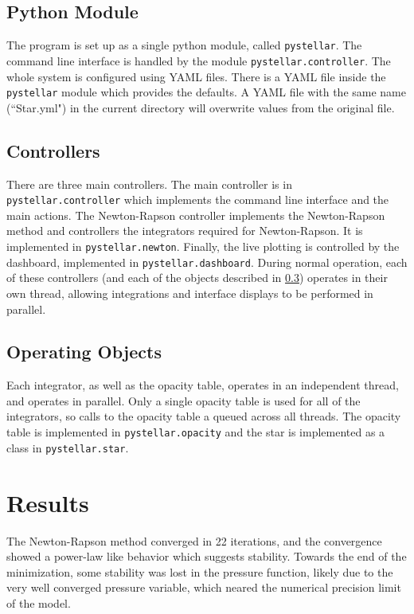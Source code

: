 \documentclass[12pt]{article}
\begin{document}
\subsection{Python Module}
The program is set up as a single python module, called \lstinline{pystellar}. The command line interface is handled by the module \lstinline{pystellar.controller}. The whole system is configured using YAML files. There is a YAML file inside the \lstinline{pystellar} module which provides the defaults. A YAML file with the same name (``Star.yml") in the current directory will overwrite values from the original file.

\subsection{Controllers}
There are three main controllers. The main controller is in \lstinline{pystellar.controller} which implements the command line interface and the main actions. The Newton-Rapson controller implements the Newton-Rapson method and controllers the integrators required for Newton-Rapson. It is implemented in \lstinline{pystellar.newton}. Finally, the live plotting is controlled by the dashboard, implemented in \lstinline{pystellar.dashboard}. During normal operation, each of these controllers (and each of the objects described in \cref{sec:objects}) operates in their own thread, allowing integrations and interface displays to be performed in parallel.

\subsection{Operating Objects} \label{sec:objects}
Each integrator, as well as the opacity table, operates in an independent thread, and operates in parallel. Only a single opacity table is used for all of the integrators, so calls to the opacity table a queued across all threads. The opacity table is implemented in \lstinline{pystellar.opacity} and the star is implemented as a class in \lstinline{pystellar.star}.

\section{Results} \label{sec:results}
The Newton-Rapson method converged in 22 iterations, and the convergence showed a power-law like behavior which suggests stability. Towards the end of the minimization, some stability was lost in the pressure function, likely due to the very well converged pressure variable, which neared the numerical precision limit of the model.
\end{document}
